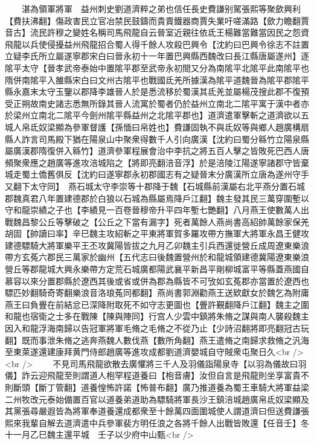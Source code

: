 　　湛為領軍將軍　益州刺史劉道濟粹之弟也信任長史費謙别駕張熙等聚歛興利【費扶沸翻】傷政害民立官冶禁民鼓鑄而貴賣鐵器商賈失業吁嗟滿路【歛力瞻翻賈音古】流民許穆之變姓名稱司馬飛龍自云晉室近親往依氐王楊難當難當因民之怨資飛龍以兵使侵擾益州飛龍招合蜀人得千餘人攻殺巴興令【沈約曰巴興令徐志不註置立疑李氏所立屬遂寧郡宋白曰晉永初十一年置巴興縣西魏改曰長江縣唐屬遂州】逐隂平太守【晉孝武帝泰始中置隂平郡至武帝永初間又分為南隂平北隂平此南隂平也隋併南隂平入雒縣宋白曰文州古隂平也戰國氐羌所據漢為隂平道魏晉為隂平郡隂平縣永嘉末太守玉鑒以郡降李雄晉人於是悉流移於蜀漢其氐羌並屬楊茂搜此郡不復預受正朔故南史諸志悉無所錄其晉人流寓於蜀者仍於益州立南北二隂平寓于漢中者亦於梁州立南北二隂平今劍州隂平縣益州之北隂平郡也】道濟遣軍擊斬之道濟欲以五城人帛氐奴梁顯為參軍督護【孫愐曰帛姓也】費謙固執不與氐奴等與鄉人趙廣構扇縣人詐言司馬殿下猶在陽泉山中聚衆得數千人引向廣漢【沈約曰蜀分緜竹立陽泉縣屬廣漢郡隋復併入緜竹】道濟參軍程展會治中李抗之將五百人擊之皆敗死巴西人唐頻聚衆應之趙廣等進攻涪城陷之【將即亮翻涪音浮】於是涪陵江陽遂寧諸郡守皆棄城走蜀土僑舊俱反【沈約曰遂寧郡永初郡國志有之疑晉末分廣漢所立唐為遂州守手又翻下太守同】　燕石城太守李崇等十郡降于魏【石城縣前漢屬右北平燕分置石城郡魏真君八年置建德郡於白狼以石城為縣屬焉降戶江翻】魏主發其民三萬穿圍塹以守和龍崇績之子也【李績見一百卷晉穆帝升平四年塹七艷翻】八月燕王使數萬人出戰魏昌黎公丘等擊破之【公丘之下當有漏字】死者萬餘人燕尚書高紹帥萬餘家保羌胡固【帥讀曰率】辛巳魏主攻紹斬之平東將軍賀多羅攻帶方撫軍大將軍永昌王健攻建德驃騎大將軍樂平王丕攻冀陽皆拔之九月乙卯魏主引兵西還徙營丘成周遼東樂浪帶方玄菟六郡民三萬家於幽州【五代志曰後魏置營州於和龍城領建德冀陽遼東樂浪營丘等郡龍城大興永樂帶方定荒石城廣都陽武襄平新昌平剛柳城富平等縣蓋燕國自慕容以來分置郡縣於遼西其後或省或併為郡為縣皆不可攷如玄菟郡亦當置於遼西也驃匹妙翻騎奇寄翻樂浪音洛琅菟同都翻】燕尚書郭淵勸燕王送欵獻女於魏乞為附庸燕王曰負舋在前結忿已深降附取死不如守志更圖也【舋許覲翻降戶江翻】魏主之圍和龍也宿衛之士多在戰陳【陳與陣同】行宫人少雲中鎮將朱脩之謀與南人襲殺魏主因入和龍浮海南歸以告冠軍將軍毛脩之毛脩之不從乃止【少詩沼翻將即亮翻冠古玩翻】既而事泄朱脩之逃奔燕魏人數伐燕【數所角翻】燕王遣脩之南歸求救脩之汎海至東萊遂還建康拜黄門侍郎趙廣等進攻成都劉道濟嬰城自守賊衆屯聚日久<br />
<br />
　　不見司馬飛龍欲散去廣懼將三千人及羽儀詣陽泉寺【以羽為儀故曰羽儀】詐云迎飛龍至則謂道人枹罕程道養曰【枹音膚】汝但自言是飛龍則坐享富貴不則斷頭【斷丁管翻】道養惶怖許諾【怖普布翻】廣乃推道養為蜀王車騎大將軍益梁二州牧改元泰始備置百官以道養弟道助為驃騎將軍長沙王鎮涪城趙廣帛氐奴梁顯及其黨張尋嚴遐皆為將軍奉道養還成都衆至十餘萬四面圍城使人謂道濟曰但送費謙張熙來我輩自解去道濟遣中兵參軍裴方明任浪之各將千餘人出戰皆敗還【任音壬】冬十一月乙巳魏主還平城　壬子以少府中山甄<br />
